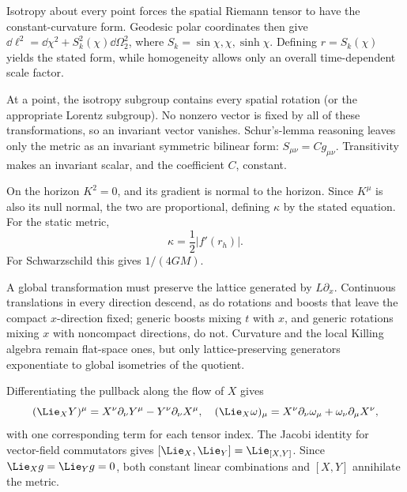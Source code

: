 \begin{solutions}
\begin{solution}
Isotropy about every point forces the spatial Riemann tensor to have the
constant-curvature form.  Geodesic polar coordinates then give
\(\dd\ell^2=\dd\chi^2+S_k^2(\chi)\dd\Omega_2^2\), where
\(S_k=\sin\chi,\chi,\sinh\chi\).  Defining
\(r=S_k(\chi)\) yields the stated form, while homogeneity allows only an
overall time-dependent scale factor.
\end{solution}

\begin{solution}
At a point, the isotropy subgroup contains every spatial rotation (or the
appropriate Lorentz subgroup).  No nonzero vector is fixed by all of these
transformations, so an invariant vector vanishes.  Schur's-lemma reasoning
leaves only the metric as an invariant symmetric bilinear form:
\(S_{\mu\nu}=Cg_{\mu\nu}\).  Transitivity makes an invariant scalar, and the
coefficient \(C\), constant.
\end{solution}

\begin{solution}
On the horizon \(K^2=0\), and its gradient is normal to the horizon.  Since
\(K^\mu\) is also its null normal, the two are proportional, defining
\(\kappa\) by the stated equation.  For the static metric,
\[
\kappa=\frac12|f'(r_h)|.
\]
For Schwarzschild this gives \(1/(4GM)\).
\end{solution}

\begin{solution}
A global transformation must preserve the lattice generated by
\(L\partial_x\).  Continuous translations in every direction descend, as do
rotations and boosts that leave the compact \(x\)-direction fixed; generic
boosts mixing \(t\) with \(x\), and generic rotations mixing \(x\) with
noncompact directions, do not.  Curvature and the local Killing algebra
remain flat-space ones, but only lattice-preserving generators exponentiate
to global isometries of the quotient.
\end{solution}

\begin{solution}
Differentiating the pullback along the flow of \(X\) gives
\[
(\Lie_XY)^\mu=X^\nu\partial_\nu Y^\mu-Y^\nu\partial_\nu X^\mu,
\quad
(\Lie_X\omega)_\mu
=X^\nu\partial_\nu\omega_\mu+\omega_\nu\partial_\mu X^\nu,
\]
with one corresponding term for each tensor index.  The Jacobi identity for
vector-field commutators gives
\([\Lie_X,\Lie_Y]=\Lie_{[X,Y]}\).  Since
\(\Lie_Xg=\Lie_Yg=0\), both constant linear combinations and
\([X,Y]\) annihilate the metric.


\end{solution}
\end{solutions}

